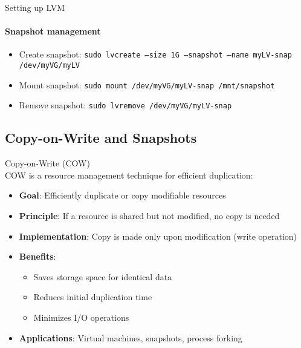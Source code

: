 \begin{KR}{Setting up LVM}
    \paragraph{Snapshot management}
    \begin{itemize}
        \item Create snapshot: \texttt{sudo lvcreate --size 1G --snapshot --name myLV-snap /dev/myVG/myLV}
        \item Mount snapshot: \texttt{sudo mount /dev/myVG/myLV-snap /mnt/snapshot}
        \item Remove snapshot: \texttt{sudo lvremove /dev/myVG/myLV-snap}
    \end{itemize}
\end{KR}

\subsection{Copy-on-Write and Snapshots}

\begin{definition}{Copy-on-Write (COW)}\\
    COW is a resource management technique for efficient duplication:
    \begin{itemize}
        \item \textbf{Goal}: Efficiently duplicate or copy modifiable resources
        \item \textbf{Principle}: If a resource is shared but not modified, no copy is needed
        \item \textbf{Implementation}: Copy is made only upon modification (write operation)
        \item \textbf{Benefits}:
            \begin{itemize}
                \item Saves storage space for identical data
                \item Reduces initial duplication time
                \item Minimizes I/O operations
            \end{itemize}
        \item \textbf{Applications}: Virtual machines, snapshots, process forking
    \end{itemize}
\end{definition}

